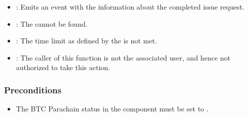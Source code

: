 \documentclass[a4paper,10pt,english]{sphinxmanual}
\begin{document}
\begin{itemize}
\item {} 
: Emits an event with the information about the completed issue request.

\end{itemize}

\begin{itemize}
\item {} 
: The  cannot be found.

\item {} 
: The time limit as defined by the  is not met.

\item {} 
: The caller of this function is not the associated user, and hence not authorized to take this action.

\end{itemize}


\subsubsection{Preconditions}
\label{\detokenize{spec/issue:id5}}\begin{itemize}
\item {} 
The BTC Parachain status in the {\hyperref[\detokenize{spec/security:security}]{}} component must be set to .

\end{itemize}
\end{document}
